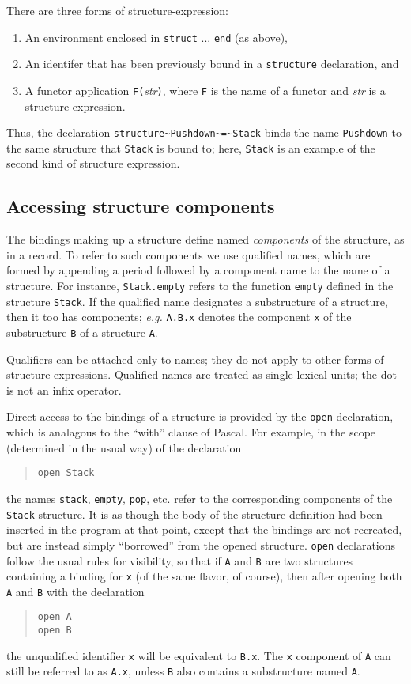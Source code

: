 There are three forms of structure-expression:
\begin{enumerate}
\item An environment enclosed in \verb"struct" ... \verb"end" (as
above),

\item An identifer that has been previously bound in a
\verb"structure" declaration, and

\item A functor application \verb"F("{\it str}\verb")", where
\verb"F" is the name of a functor and {\it str} is a structure
expression.
\end{enumerate}
Thus, the declaration \verb"structure~Pushdown~=~Stack" binds the
name \verb"Pushdown" to the same structure that \verb"Stack" is bound
to; here, \verb"Stack" is an example of the second kind of structure
expression.

\subsection{Accessing structure components}
The bindings making up a structure define named {\em components} of
the structure, as in a record.  To refer to such components we use
qualified names, which are formed by appending a period followed by a
component name to the name of a structure.  For instance,
\verb"Stack.empty" refers to the function \verb"empty" defined in the
structure \verb"Stack".  If the qualified name designates a
substructure of a structure, then it too has components; {\em e.g.}
\verb"A.B.x" denotes the component \verb"x" of the substructure
\verb"B" of a structure \verb"A".

Qualifiers can be attached only to names; they do not apply to other
forms of structure expressions.  Qualified names are treated as
single lexical units; the dot is not an infix operator.

Direct access to the bindings of a structure is provided by the
\verb"open" declaration, which is analagous to the ``with'' clause of
Pascal.  For example, in the scope (determined in the usual way) of
the declaration
\begin{quote}
\verb"open Stack"
\end{quote}
the names \verb"stack", \verb"empty", \verb"pop", etc. refer to the
corresponding components of the \verb"Stack" structure.  It is as
though the body of the structure definition had been inserted in the
program at that point, except that the bindings are not recreated,
but are instead simply ``borrowed'' from the opened structure.
\verb"open" declarations follow the usual rules for visibility, so
that if \verb"A" and \verb"B" are two structures containing a binding
for \verb"x" (of the same flavor, of course), then after opening both
\verb"A" and \verb"B" with the declaration
\begin{quote}
\verb"open A" \\
\verb"open B"
\end{quote}
the unqualified identifier \verb"x"  will be equivalent to
\verb"B.x".  The \verb"x" component of \verb"A" can still be referred
to as \verb"A.x", unless \verb"B" also contains a substructure named
\verb"A".

